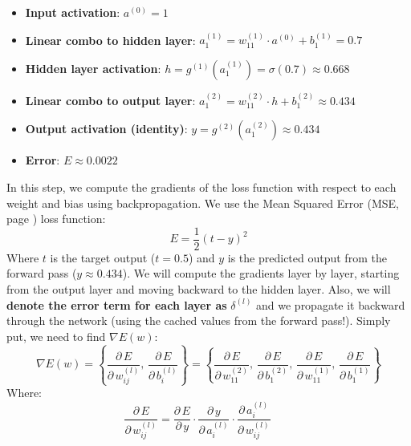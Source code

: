 \begin{examplebox}
\begin{itemize}
        \item \textbf{Input activation}: $a^{(0)} = 1$
        \item \textbf{Linear combo to hidden layer}: $a_{1}^{(1)} = w_{11}^{(1)} \cdot a^{(0)} + b_{1}^{(1)} = 0.7$
        \item \textbf{Hidden layer activation}: $h = g^{(1)}\left(a_{1}^{(1)}\right) = \sigma\left(0.7\right) \approx 0.668$
        \item \textbf{Linear combo to output layer}: $a_{1}^{(2)} = w_{11}^{(2)} \cdot h + b_{1}^{(2)} \approx 0.434$
        \item \textbf{Output activation (identity)}: $y = g^{(2)}\left(a_{1}^{(2)}\right) \approx 0.434$
        \item \textbf{Error}: $E \approx 0.0022$
    \end{itemize}
     In this step, we compute the gradients of the loss function with respect to each weight and bias using backpropagation. We use the Mean Squared Error (MSE, page \pageref{box:mse}) loss function:
    \begin{equation*}
        E = \dfrac{1}{2} \left(t - y\right)^{2}
    \end{equation*}
    Where $t$ is the target output ($t=0.5$) and $y$ is the predicted output from the forward pass ($y \approx 0.434$). We will compute the gradients layer by layer, starting from the output layer and moving backward to the hidden layer. Also, we will \textbf{denote the error term for each layer as} $\delta^{(l)}$ and we propagate it backward through the network (using the cached values from the forward pass!). Simply put, we need to find $\nabla E(w)$:
    \begin{equation*}
        \nabla E(w) = \left\{
            \dfrac{\partial \, E}{\partial \, w_{ij}^{(l)}} , \,
            \dfrac{\partial \, E}{\partial \, b_{i}^{(l)}}
        \right\} = \left\{
            \dfrac{\partial \, E}{\partial \, w_{11}^{(2)}}, \,
            \dfrac{\partial \, E}{\partial \, b_{1}^{(2)}}, \,
            \dfrac{\partial \, E}{\partial \, w_{11}^{(1)}}, \,
            \dfrac{\partial \, E}{\partial \, b_{1}^{(1)}}
        \right\}
    \end{equation*}
    Where:
    \begin{equation*}
        \dfrac{\partial \, E}{\partial \, w_{ij}^{(l)}} = \dfrac{\partial \, E}{\partial \, y} \cdot \dfrac{\partial \, y}{\partial \, a_{i}^{(l)}} \cdot \dfrac{\partial \, a_{i}^{(l)}}{\partial \, w_{ij}^{(l)}}
        \qquad

\end{equation*}
\end{examplebox}
